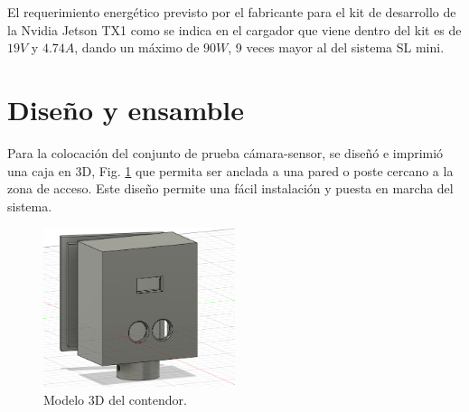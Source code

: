 El requerimiento energético previsto por el fabricante para el kit de desarrollo de la Nvidia Jetson TX1 como se indica
en el cargador que viene dentro del kit es de $19V$ y $4.74A$, dando un máximo de $90W$, 9 veces mayor al del sistema SL mini.

\section{Diseño y ensamble}

Para la colocación del conjunto de prueba cámara-sensor, se diseñó e imprimió una caja en 3D, Fig. \ref{fig:contenedor-camara} que permita ser anclada a una pared o poste cercano a la zona de acceso. Este diseño permite una fácil instalación y puesta en marcha del sistema.
\begin{figure}
    \centering
    \includegraphics[width=0.5\textwidth]{imgs/contenedor-camara.png}
    \caption{Modelo 3D del contendor.}
    \label{fig:contenedor-camara}
\end{figure}

